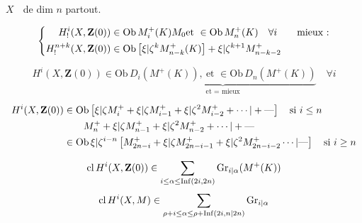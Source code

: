 $X$ \textcircled{}  de dim $n$ partout.

\[
\left\{\begin{aligned}
H^i_!(X,\mathbf{Z}(0))&\in\mathrm{Ob}\,M_i^+(K)M_0\text{et }\in\mathrm{Ob}\,M_n^+(K)\quad\forall i\qquad\text{mieux :}\\
H^{n+k}_!(X,\mathbf{Z}(0))&\in\mathrm{Ob}\left[\xi|\zeta^{k}M_{n-k}^+(K)\right]+\xi|\zeta^{k+1}M^+_{n-k-2}
\end{aligned}\right.
\]

\[
H^i(X,\mathbf{Z}(0))\in\mathrm{Ob}\,\underbrace{D_i(M^+(K)),\ \text{et }\in\mathrm{Ob}\,D_n(M^+(K))}_{\text{et }=\text{ mieux}}\quad\forall i
\]

\[
\begin{aligned}
H^i(X,\mathbf{Z}(0))&\in\mathrm{Ob}\left[\xi|\zeta M_i^++\xi|\zeta M_{i-1}^++\xi|\zeta^{2}M_{i-2}^++\cdots|+\text{---}\right]\quad\text{si }i\leq n\\
&\qquad M^+_{n}+\xi|\zeta M^+_{n-1}+\xi|\zeta^{2}M^+_{n-2}+\cdots|+\text{---}\\
&\in\mathrm{Ob}\,\xi|\zeta^{i-n}\left[M^+_{2n-i}+\xi|\zeta M^+_{2n-i-1}+\xi|\zeta^{2}M^+_{2n-i-2}\cdots|\text{---}\right]\quad\text{si }i\geq n
\end{aligned}
\]

\[
\mathrm{cl}\,H^i(X,\mathbf{Z}(0))\in\sum_{i\leq\alpha\leq\mathrm{Inf}(2i,2n)}\mathrm{Gr}_{i|\alpha}(M^+(K))
\]
\[
\mathrm{cl}\,H^i(X,M)\in\sum_{\rho+i\leq\alpha\leq\rho+\mathrm{Inf}(2i,n|2n)}\mathrm{Gr}_{i|\alpha}
\]
